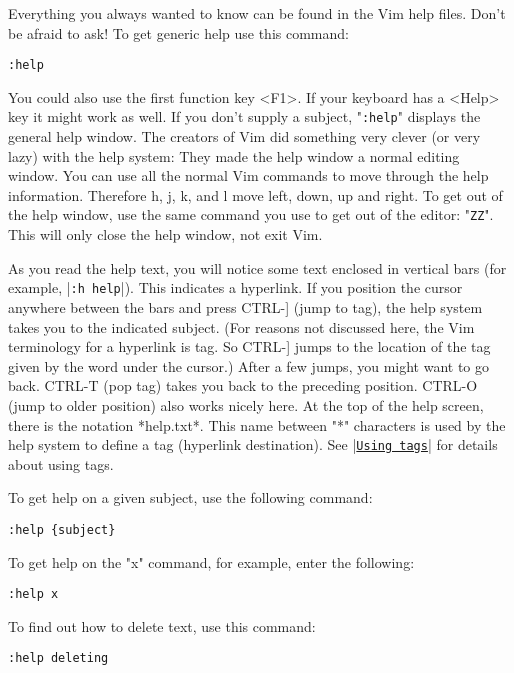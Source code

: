 Everything you always wanted to know can be found in the Vim help files.
Don't be afraid to ask!
To get generic help use this command:

 \begin{Verbatim}[samepage=true]
 :help
 \end{Verbatim}

You could also use the first function key <F1>.
If your keyboard has a <Help> key it might work as well.
If you don't supply a subject, "\verb!:help!" displays the general help window.
The creators of Vim did something very clever (or very lazy) with the help system: They made the help window a normal editing window.
You can use all the normal Vim commands to move through the help information.
Therefore h, j, k, and l move left, down, up and right.
To get out of the help window, use the same command you use to get out of the editor: "\verb!ZZ!".
This will only close the help window, not exit Vim.

As you read the help text, you will notice some text enclosed in vertical bars (for example, |\verb!:h help!|).
This indicates a hyperlink.
If you position the cursor anywhere between the bars and press CTRL-] (jump to tag), the help system takes you to the indicated subject.
(For reasons not discussed here, the Vim terminology for a hyperlink is tag.
So CTRL-] jumps to the location of the tag given by the word under the cursor.) After a few jumps, you might want to go back.
CTRL-T (pop tag) takes you back to the preceding position.
CTRL-O (jump to older position) also works nicely here.
At the top of the help screen, there is the notation *help.txt*.
This name between "*" characters is used by the help system to define a tag (hyperlink destination).
See |\hyperref[Using tags]{\texttt{Using tags}}| for details about using tags.

To get help on a given subject, use the following command:

 \begin{Verbatim}[samepage=true]
 :help {subject}
 \end{Verbatim}

To get help on the "x" command, for example, enter the following:

 \begin{Verbatim}[samepage=true]
 :help x
 \end{Verbatim}

To find out how to delete text, use this command:

 \begin{Verbatim}[samepage=true]
 :help deleting
 \end{Verbatim}

